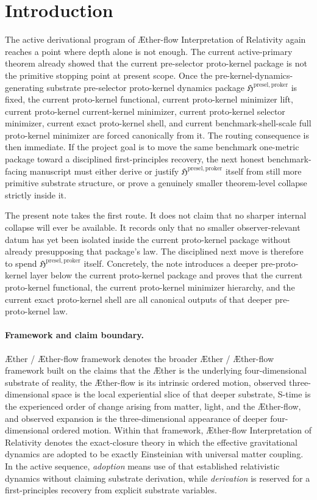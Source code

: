 \documentclass[11pt]{article}
\newcommand{\Aether}{\AE{}ther}
\newcommand{\Aflow}{\AE{}ther-flow}
\newcommand{\TheoryName}{\Aflow{} Interpretation of Relativity}
\newcommand{\TheoryProgram}{\Aether{} / \Aflow{} framework}
\newcommand{\ProtoKernelPackage}{\mathfrak H^{\mathrm{presel,proker}}}
\begin{document}
\section{Introduction}

The active derivational program of \TheoryName{} again reaches a point where depth alone is not enough. The current active-primary theorem already showed that the current pre-selector proto-kernel package is not the primitive stopping point at present scope. Once the pre-kernel-dynamics-generating substrate pre-selector proto-kernel dynamics package \(\ProtoKernelPackage\) is fixed, the current proto-kernel functional, current proto-kernel minimizer lift, current proto-kernel current-kernel minimizer, current proto-kernel selector minimizer, current exact proto-kernel shell, and current benchmark-shell-scale full proto-kernel minimizer are forced canonically from it. The routing consequence is then immediate. If the project goal is to move the same benchmark one-metric package toward a disciplined first-principles recovery, the next honest benchmark-facing manuscript must either derive or justify \(\ProtoKernelPackage\) itself from still more primitive substrate structure, or prove a genuinely smaller theorem-level collapse strictly inside it.

The present note takes the first route. It does not claim that no sharper internal collapse will ever be available. It records only that no smaller observer-relevant datum has yet been isolated inside the current proto-kernel package without already presupposing that package's law. The disciplined next move is therefore to spend \(\ProtoKernelPackage\) itself. Concretely, the note introduces a deeper pre-proto-kernel layer below the current proto-kernel package and proves that the current proto-kernel functional, the current proto-kernel minimizer hierarchy, and the current exact proto-kernel shell are all canonical outputs of that deeper pre-proto-kernel law.

\paragraph{Framework and claim boundary.}
\TheoryProgram{} denotes the broader \Aether{} / \Aflow{} framework built on the claims that the \Aether{} is the underlying four-dimensional substrate of reality, the \Aflow{} is its intrinsic ordered motion, observed three-dimensional space is the local experiential slice of that deeper substrate, S-time is the experienced order of change arising from matter, light, and the \Aflow{}, and observed expansion is the three-dimensional appearance of deeper four-dimensional ordered motion. Within that framework, \TheoryName{} denotes the exact-closure theory in which the effective gravitational dynamics are adopted to be exactly Einsteinian with universal matter coupling. In the active sequence, \emph{adoption} means use of that established relativistic dynamics without claiming substrate derivation, while \emph{derivation} is reserved for a first-principles recovery from explicit substrate variables.
\end{document}

